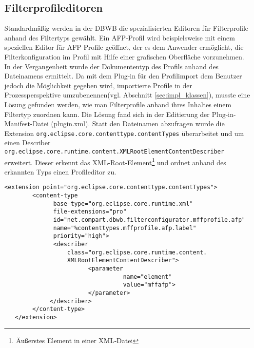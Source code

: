 {{{{{}

\subsection{Filterprofileditoren}{
Standardmäßig werden in der \ac{DBWB} die spezialisierten Editoren für Filterprofile anhand des Filtertyps gewählt. Ein \ac{AFP}-Profil wird beispielsweise mit einem speziellen Editor für \ac{AFP}-Profile geöffnet, der es dem Anwender ermöglicht, die Filterkonfiguration im Profil mit Hilfe einer grafischen Oberfläche vorzunehmen. In der Vergangenheit wurde der Dokumententyp des Profils anhand des Dateinamens ermittelt. Da mit dem Plug-in für den Profilimport dem Benutzer jedoch die Möglichkeit gegeben wird, importierte Profile in der Prozessperspektive umzubenennen(vgl. Abschnitt \ref{sec:impl_klassen}), musste eine Lösung gefunden werden, wie man Filterprofile anhand ihres Inhaltes einem Filtertyp zuordnen kann. Die Lösung fand sich in der Editierung der Plug-in-Manifest-Datei (plugin.xml). Statt den Dateinamen abzufragen wurde die Extension \texttt{org.eclipse.core.contenttype.contentTypes} überarbeitet und um einen Describer
\\
\texttt{org.eclipse.core.runtime.content.XMLRootElementContentDescriber} erweitert. Dieser erkennt das \ac{XML}-Root-Element\footnote{Äußerstes Element in einer XML-Datei} und ordnet anhand des erkannten Typs einen Profileditor zu.

\begin{lstlisting}[caption={Bearbeitete ContentType-Extension am Beispiel des Formattyps AFP},label=lst:filter_editor]
  <extension point="org.eclipse.core.contenttype.contentTypes">
        <content-type
              base-type="org.eclipse.core.runtime.xml"
              file-extensions="pro"
              id="net.compart.dbwb.filterconfigurator.mffprofile.afp"
              name="%contenttypes.mffprofile.afp.label"
              priority="high">
              <describer
                  class="org.eclipse.core.runtime.content.
                  XMLRootElementContentDescriber">
                        <parameter 
                                  name="element" 
                                  value="mffafp">
                        </parameter>
             </describer>
        </content-type>
   </extension>
\end{lstlisting}




}


}}}}
